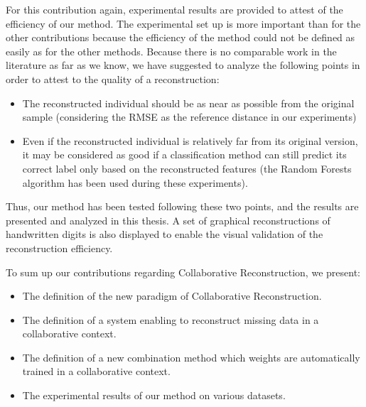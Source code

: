 For this contribution again, experimental results are provided to attest of the efficiency of our method. The experimental set up is more important than for the other contributions because the efficiency of the method could not be defined as easily as for the other methods. Because there is no comparable work in the literature as far as we know, we have suggested to analyze the following points in order to attest to the quality of a reconstruction:
\begin{itemize}
    \item The reconstructed individual should be as near as possible from the original sample (considering the RMSE as the reference distance in our experiments)
    \item Even if the reconstructed individual is relatively far from its original version, it may be considered as good if a classification method can still predict its correct label only based on the reconstructed features (the Random Forests algorithm has been used during these experiments).
\end{itemize}

Thus, our method has been tested following these two points, and the results are presented and analyzed in this thesis. A set of graphical reconstructions of handwritten digits is also displayed to enable the visual validation of the reconstruction efficiency.

To sum up our contributions regarding Collaborative Reconstruction, we present:
\begin{itemize}
    \item The definition of the new paradigm of Collaborative Reconstruction.
    \item The definition of a system enabling to reconstruct missing data in a collaborative context.
    \item The definition of a new combination method which weights are automatically trained in a collaborative context.
    \item The experimental results of our method on various datasets.
\end{itemize}


